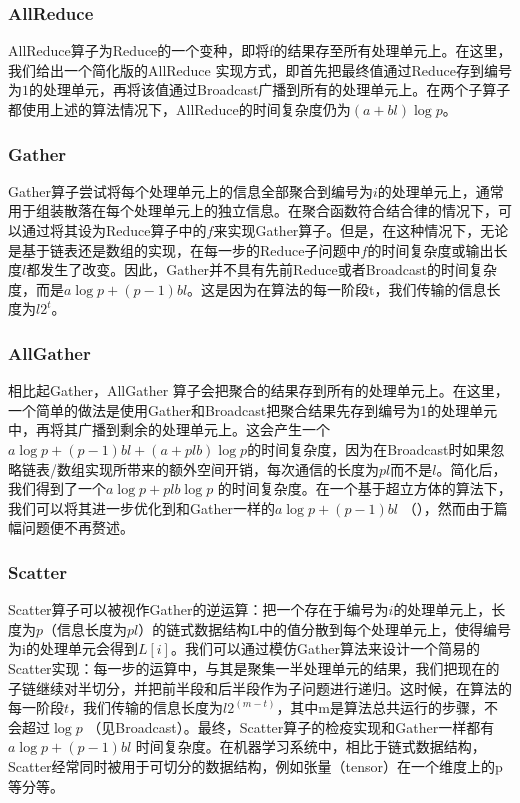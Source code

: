 \documentclass[letterpaper,10pt,english]{sphinxmanual}
\begin{document}
\subsubsection{AllReduce}
\label{\detokenize{chapter_distributed_training/collective:allreduce}}
\sphinxAtStartPar
AllReduce算子为Reduce的一个变种，即将f的结果存至所有处理单元上。在这里，我们给出一个简化版的AllReduce
实现方式，即首先把最终值通过Reduce存到编号为\(1\)的处理单元，再将该值通过Broadcast广播到所有的处理单元上。在两个子算子都使用上述的算法情况下，AllReduce的时间复杂度仍为\((a+bl)\log p。\)


\subsubsection{Gather}
\label{\detokenize{chapter_distributed_training/collective:gather}}
\sphinxAtStartPar
Gather算子尝试将每个处理单元上的信息全部聚合到编号为\(i\)的处理单元上，通常用于组装散落在每个处理单元上的独立信息。在聚合函数符合结合律的情况下，可以通过将其设为Reduce算子中的\(f\)来实现Gather算子。但是，在这种情况下，无论是基于链表还是数组的实现，在每一步的Reduce子问题中\(f\)的时间复杂度或输出长度\(l\)都发生了改变。因此，Gather并不具有先前Reduce或者Broadcast的时间复杂度，而是\(a \log p + (p-1) bl\)。这是因为在算法的每一阶段t，我们传输的信息长度为\(l 2^t\)。


\subsubsection{AllGather}
\label{\detokenize{chapter_distributed_training/collective:allgather}}
\sphinxAtStartPar
相比起Gather，AllGather
算子会把聚合的结果存到所有的处理单元上。在这里，一个简单的做法是使用Gather和Broadcast把聚合结果先存到编号为1的处理单元中，再将其广播到剩余的处理单元上。这会产生一个\(a \log p + (p-1) bl + (a+plb) \log p\)的时间复杂度，因为在Broadcast时如果忽略链表/数组实现所带来的额外空间开销，每次通信的长度为\(pl\)而不是\(l\)。简化后，我们得到了一个\(a \log p + plb \log p\)
的时间复杂度。在一个基于超立方体的算法下，我们可以将其进一步优化到和Gather一样的\(a \log p + (p-1) bl\)
（），然而由于篇幅问题便不再赘述。


\subsubsection{Scatter}
\label{\detokenize{chapter_distributed_training/collective:scatter}}
\sphinxAtStartPar
Scatter算子可以被视作Gather的逆运算：把一个存在于编号为\(i\)的处理单元上，长度为\(p\)（信息长度为\(pl\)）的链式数据结构L中的值分散到每个处理单元上，使得编号为i的处理单元会得到\(L[i]\)。我们可以通过模仿Gather算法来设计一个简易的Scatter实现：每一步的运算中，与其是聚集一半处理单元的结果，我们把现在的子链继续对半切分，并把前半段和后半段作为子问题进行递归。这时候，在算法的每一阶段\(t\)，我们传输的信息长度为\(l 2^(m-t)\)，其中m是算法总共运行的步骤，不会超过\(\log p\)
（见Broadcast）。最终，Scatter算子的检疫实现和Gather一样都有\(a \log p + (p-1) bl\)
时间复杂度。在机器学习系统中，相比于链式数据结构，Scatter经常同时被用于可切分的数据结构，例如张量（tensor）在一个维度上的p等分等。
\end{document}
